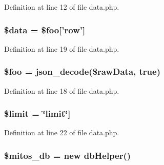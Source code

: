 \-Definition at line 12 of file data.\-php.

\hypertarget{administration_2lists_2data_8php_a6efc15b5a2314dd4b5aaa556a375c6d6}{
\subsubsection[{\$data}]{\setlength{\rightskip}{0pt plus 5cm}\$data = \$foo\mbox{[}'row'\mbox{]}}}\label{administration_2lists_2data_8php_a6efc15b5a2314dd4b5aaa556a375c6d6}


\-Definition at line 19 of file data.\-php.

\hypertarget{administration_2lists_2data_8php_a7a1efa8a0f6183fb3a5e8e8b0696526c}{
\subsubsection[{\$foo}]{\setlength{\rightskip}{0pt plus 5cm}\$foo = json\-\_\-decode(\$raw\-Data, true)}}\label{administration_2lists_2data_8php_a7a1efa8a0f6183fb3a5e8e8b0696526c}


\-Definition at line 18 of file data.\-php.

\hypertarget{administration_2lists_2data_8php_ae05862a0294251c88629b141b5ce329a}{
\subsubsection[{\$limit}]{\setlength{\rightskip}{0pt plus 5cm}\$limit = \char`\"{}limit\char`\"{}\mbox{]}}}\label{administration_2lists_2data_8php_ae05862a0294251c88629b141b5ce329a}


\-Definition at line 22 of file data.\-php.

\hypertarget{administration_2lists_2data_8php_ab5d961f93efe4e2e8d8374f01dd6c65a}{
\subsubsection[{\$mitos\-\_\-db}]{\setlength{\rightskip}{0pt plus 5cm}\$mitos\-\_\-db = new {\bf db\-Helper}()}}\label{administration_2lists_2data_8php_ab5d961f93efe4e2e8d8374f01dd6c65a}


